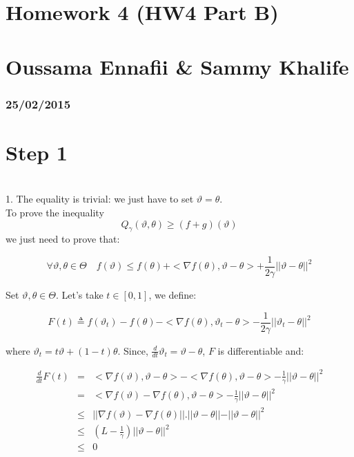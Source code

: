 


\geometry{hmargin=2.5cm,vmargin=2cm}   

	
	\section*{Homework 4 (HW4 Part B)}
	\section*{Oussama Ennafii \& Sammy Khalife}
	\subsubsection*{25/02/2015}

\section*{Step 1}
~\\

1. The equality is trivial: we just have to set $\vartheta=\theta$.\\

To prove the inequality $$ Q_{\gamma}(\vartheta,\theta)\geq (f+g)(\vartheta)$$ we just need to prove that:

$$\forall \vartheta , \theta \in \Theta \quad f(\vartheta)\leq f(\theta)+<\nabla f(\theta),\vartheta-\theta>+\frac{1}{2\gamma}\vert\vert \vartheta-\theta\vert\vert^2$$

Set $ \vartheta , \theta \in \Theta$. Let's take $t \in [0,1]$, we define:

\begin{equation}
F(t) \triangleq f(\vartheta_t)-f(\theta)-<\nabla f(\theta),\vartheta_t-\theta>-\frac{1}{2\gamma}\vert\vert \vartheta_t-\theta\vert\vert^2
\end{equation}

where $\vartheta_t=t \vartheta+(1-t)\theta$. Since, $\frac{d}{dt}\vartheta_t=\vartheta-\theta$, $F$ is differentiable and:

\begin{eqnarray*}
	\frac{d}{dt}F(t)&=& <\nabla f(\vartheta), \vartheta-\theta> - <\nabla f(\theta), \vartheta-\theta>-\frac{1}{\gamma}\vert\vert \vartheta-\theta\vert\vert^2\\
						&=& <\nabla f(\vartheta)- \nabla f(\theta), \vartheta-\theta> -\frac{1}{\gamma}\vert\vert \vartheta-\theta\vert\vert^2\\
						&\leq& \vert\vert  \nabla f(\vartheta)- \nabla f(\theta)\vert \vert . \vert \vert \vartheta-\theta\vert \vert -\vert\vert \vartheta-\theta\vert\vert^2\\
						&\leq& (L-\frac{1}{\gamma})\vert\vert \vartheta-\theta\vert\vert^2\\
						&\leq& 0
\end{eqnarray*}

